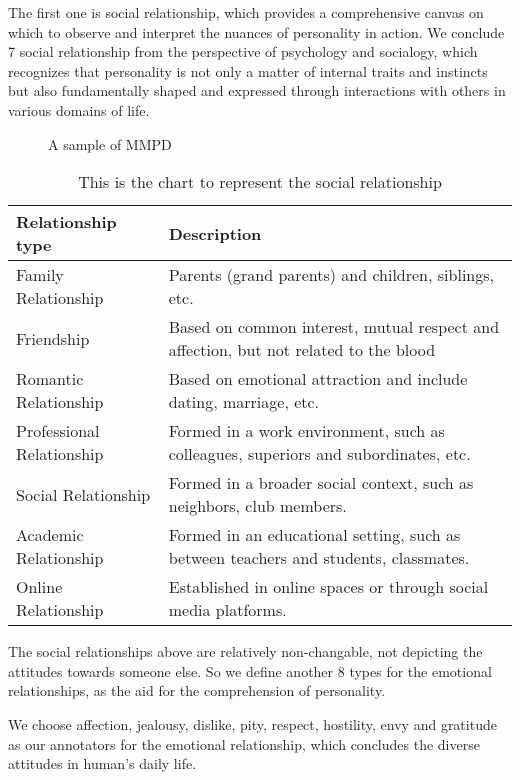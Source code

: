 \documentclass[11pt]{article}
\begin{document}
The first one is social relationship, which provides a comprehensive canvas on which to observe and interpret the nuances of personality in action. We conclude 7 social relationship from the perspective of psychology and socialogy, which recognizes that personality is not only a matter of internal traits and instincts but also fundamentally shaped and expressed through interactions with others in various domains of life. 
\begin{figure}[h]
  \centering
  
  \caption{A sample of MMPD}
\end{figure}
\begin{table*}
\centering
\begin{tabular}{ll}
  \hline
  \textbf{Relationship type} & \textbf{Description}\\
  \hline
  Family Relationship & Parents (grand parents) and children, siblings, etc.\\
  \hline
  Friendship & Based on common interest, mutual respect and affection, but not related to the blood\\
  \hline
  Romantic Relationship & Based on emotional attraction and include dating, marriage, etc.\\
  \hline
  Professional Relationship & Formed in a work environment, such as colleagues, superiors and subordinates, etc.\\ 
  \hline
  Social Relationship & Formed in a broader social context, such as neighbors, club members.\\
  \hline
  Academic Relationship & Formed in an educational setting, such as between teachers and students, classmates.\\
  \hline
  Online Relationship & Established in online spaces or through social media platforms.\\
  \hline
\end{tabular}
\caption{This is the chart to represent the social relationship}
\end{table*}

The social relationships above are relatively non-changable, not depicting the attitudes towards someone else. So we define another 8 types for the emotional relationships, as the aid for the comprehension of personality. 

We choose affection, jealousy, dislike, pity, respect, hostility, envy and gratitude as our annotators for the emotional relationship, which concludes the diverse attitudes in human's daily life.
\end{document}
